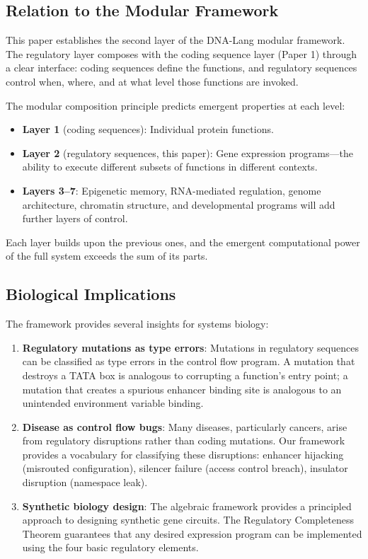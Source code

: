 \documentclass[12pt,a4paper]{article}
\begin{document}
\subsection{Relation to the Modular Framework}

This paper establishes the second layer of the DNA-Lang modular framework.  The regulatory layer composes with the coding sequence layer (Paper 1) through a clear interface: coding sequences define the functions, and regulatory sequences control when, where, and at what level those functions are invoked.

The modular composition principle predicts emergent properties at each level:
\begin{itemize}
  \item \textbf{Layer 1} (coding sequences): Individual protein functions.
  \item \textbf{Layer 2} (regulatory sequences, this paper): Gene expression programs---the ability to execute different subsets of functions in different contexts.
  \item \textbf{Layers 3--7}: Epigenetic memory, RNA-mediated regulation, genome architecture, chromatin structure, and developmental programs will add further layers of control.
\end{itemize}

Each layer builds upon the previous ones, and the emergent computational power of the full system exceeds the sum of its parts.

\subsection{Biological Implications}

The framework provides several insights for systems biology:

\begin{enumerate}
  \item \textbf{Regulatory mutations as type errors}: Mutations in regulatory sequences can be classified as type errors in the control flow program.  A mutation that destroys a TATA box is analogous to corrupting a function's entry point; a mutation that creates a spurious enhancer binding site is analogous to an unintended environment variable binding.

  \item \textbf{Disease as control flow bugs}: Many diseases, particularly cancers, arise from regulatory disruptions rather than coding mutations.  Our framework provides a vocabulary for classifying these disruptions: enhancer hijacking (misrouted configuration), silencer failure (access control breach), insulator disruption (namespace leak).

  \item \textbf{Synthetic biology design}: The algebraic framework provides a principled approach to designing synthetic gene circuits.  The Regulatory Completeness Theorem guarantees that any desired expression program can be implemented using the four basic regulatory elements.
\end{enumerate}
\end{document}
